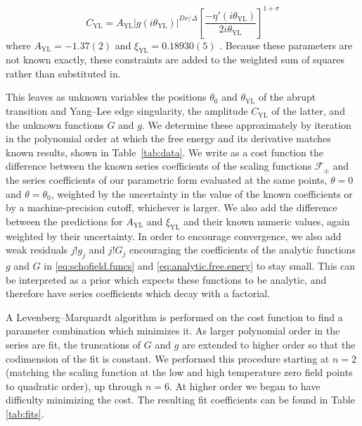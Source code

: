 \documentclass[
aps,
pre,
preprint,
longbibliography,
floatfix
]{revtex4-2}
\begin{document}
\begin{equation}
  C_\mathrm{YL}=A_\mathrm{YL}|g(i\theta_\mathrm{YL})|^{D\nu/\Delta}\left[\frac{-\eta'(i\theta_\mathrm{YL})}{2i\theta_\mathrm{YL}}\right]^{1+\sigma}
\end{equation}
where $A_\mathrm{YL}=-1.37(2)$ and $\xi_\mathrm{YL}=0.18930(5)$
\cite{Fonseca_2003_Ising}. Because these parameters are not known exactly,
these constraints are added to the weighted sum of squares rather than
substituted in.

This leaves as unknown variables the positions $\theta_0$ and
$\theta_{\mathrm{YL}}$ of the abrupt transition and Yang--Lee edge singularity,
the amplitude $C_\mathrm{YL}$ of the latter, and the unknown functions $G$ and
$g$. We determine these approximately by iteration in the polynomial order at
which the free energy and its derivative matches known results, shown in
Table~\ref{tab:data}. We write as a cost function the difference between the
known series coefficients of the scaling functions $\mathcal F_\pm$ and the
series coefficients of our parametric form evaluated at the same points,
$\theta=0$ and $\theta=\theta_0$, weighted by the uncertainty in the value of
the known coefficients or by a machine-precision cutoff, whichever is larger.
We also add the difference between the predictions for $A_\mathrm{YL}$ and
$\xi_\mathrm{YL}$ and their known numeric values, again weighted by their
uncertainty. In order to encourage convergence, we also add weak residuals
$j!g_j$ and $j!G_j$ encouraging the coefficients of the analytic functions $g$
and $G$ in \eqref{eq:schofield.funcs} and \eqref{eq:analytic.free.enery} to
stay small.  This can be interpreted as a prior which expects these functions
to be analytic, and therefore have series coefficients which decay with a
factorial.

A Levenberg--Marquardt algorithm is performed on the cost function to find a parameter combination which minimizes it. As larger polynomial order in the
series are fit, the truncations of $G$ and $g$ are extended to higher order so
that the codimension of the fit is constant.
We performed this procedure starting at $n=2$ (matching the scaling
function at the low and high temperature zero field points to quadratic order), up
through $n=6$. At higher order we began to have difficulty minimizing the cost.
The resulting fit coefficients can be found in Table \ref{tab:fits}.
\end{document}

